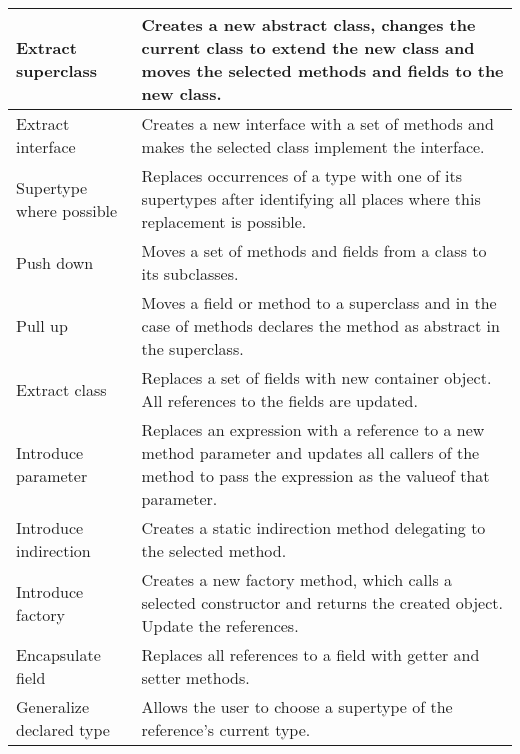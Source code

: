 \begin{table}[h]
\begin{tabular}{p{3 cm} | p{10.5 cm}}
Extract superclass        & Creates a new abstract class, changes the current class to extend the new class and moves the selected methods and fields to the new class.                               \\ \hline
Extract interface         & Creates a new interface with a set of methods and makes the selected class implement the interface.                                                                       \\ \hline
Supertype where possible  & Replaces occurrences of a type with one of its supertypes after identifying all places where this replacement is possible.                                                \\ \hline
Push down                 & Moves a set of methods and fields from a class to its subclasses.                                                                                                         \\ \hline
Pull up                   & Moves a field or method to a superclass and in the case of methods declares the method as abstract in the superclass.                                                     \\ \hline
Extract class             & Replaces a set of fields with new container object. All references to the fields are updated.                                                                             \\ \hline
Introduce parameter       & Replaces an expression with a reference to a new method parameter and updates all callers of the method to pass the expression as the valueof that parameter.             \\ \hline
Introduce indirection     & Creates a static indirection method delegating to the selected method.                                                                                                    \\ \hline
Introduce factory         & Creates a new factory method, which calls a selected constructor and returns the created object. Update the references.                                                   \\ \hline
Encapsulate field         & Replaces all references to a field with getter and setter methods.                                                                                                        \\ \hline
Generalize declared type  & Allows the user to choose a supertype of the reference's current type.                                                                                                    \\ \hline

\end{tabular}
\end{table}

